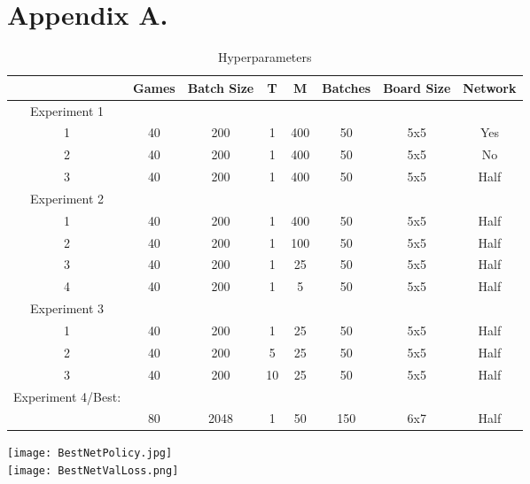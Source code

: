 \documentclass[twoside,11pt]{article}
\begin{document}
\vskip 0.2in



\appendix
\section*{Appendix A.}
\begin{table}[ht]
    \caption{Hyperparameters}
    \vspace{.3in}
\begin{center}
    \begin{tabular}{||c ||c |c |c |c|c|c|c }
             & Games & Batch Size & T & M & Batches & Board Size &Network\\
             \hline
            Experiment 1&&&&& \\
            1 & 40 & 200 & 1 & 400 & 50 & 5x5 & Yes\\
            2 & 40 & 200 & 1 & 400  & 50 & 5x5 & No\\
            3 & 40 & 200 & 1 & 400 &  50 & 5x5 &Half\\
            \hline
            Experiment 2&&& && \\
            1 & 40 & 200& 1 & 400 &  50 & 5x5 &Half\\
            2 & 40 & 200& 1 & 100 &  50 & 5x5 &Half\\
            3 & 40 & 200& 1 & 25 &  50 & 5x5 &Half\\
            4 & 40 & 200& 1 & 5 &  50 & 5x5 &Half\\
            \hline
            Experiment 3&&&&& \\
            1 & 40 & 200& 1 & 25 &  50 & 5x5 &Half\\
            2 & 40 & 200 & 5 & 25 &  50 & 5x5 &Half\\
            3 & 40 & 200 & 10 & 25 & 50& 5x5 &Half\\
            \hline
            Experiment 4/Best:&&&&& \\
            & 80 & 2048 & 1 & 50 & 150& 6x7 & Half
        \end{tabular}
    \end{center}
\end{table}


\texttt{[image: BestNetPolicy.jpg]}\\
\texttt{[image: BestNetValLoss.png]}
\end{document}
